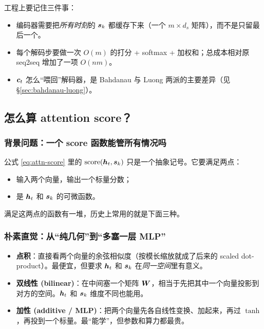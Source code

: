 \begin{engbox}
工程上要记住三件事：
\begin{itemize}
  \item 编码器需要把\emph{所有时刻}的 $\boldsymbol{s}_k$ 都缓存下来（一个 $m\times d_s$ 矩阵），而不是只留最后一个。
  \item 每个解码步要做一次 $O(m)$ 的打分 + softmax + 加权和；总成本相对原 seq2seq 增加了一项 $O(n m)$。
  \item $\boldsymbol{c}_t$ 怎么“喂回”解码器，是 Bahdanau 与 Luong 两派的主要差异（见 \S\ref{sec:bahdanau-luong}）。
\end{itemize}
\end{engbox}

\subsection{怎么算 attention score？}
\label{sec:score}

\subsubsection{背景问题：一个 score 函数能管所有情况吗}

\begin{problemblock}
公式 \eqref{eq:attn-score} 里的 $\mathrm{score}(\boldsymbol{h}_t,\boldsymbol{s}_k)$ 只是一个抽象记号。它要满足两点：
\begin{itemize}
  \item 输入两个向量，输出一个标量分数；
  \item 是 $\boldsymbol{h}_t$ 和 $\boldsymbol{s}_k$ 的可微函数。
\end{itemize}
满足这两点的函数有一堆，历史上常用的就是下面三种。
\end{problemblock}

\subsubsection{朴素直觉：从“纯几何”到“多塞一层 MLP”}

\begin{intuitionblock}
\begin{itemize}
  \item \textbf{点积}：直接看两个向量的余弦相似度（按模长缩放就成了后来的 scaled dot-product）。最便宜，但要求 $\boldsymbol{h}_t$ 和 $\boldsymbol{s}_k$ 在\emph{同一空间}里有意义。
  \item \textbf{双线性 (bilinear)}：在中间塞一个矩阵 $\boldsymbol{W}$，相当于先把其中一个向量投影到对方的空间。$\boldsymbol{h}_t$ 和 $\boldsymbol{s}_k$ 维度不同也能用。
  \item \textbf{加性 (additive / MLP)}：把两个向量先各自线性变换、加起来，再过 $\tanh$，再投到一个标量。最“能学”，但参数和算力都最贵。
\end{itemize}
\end{intuitionblock}

